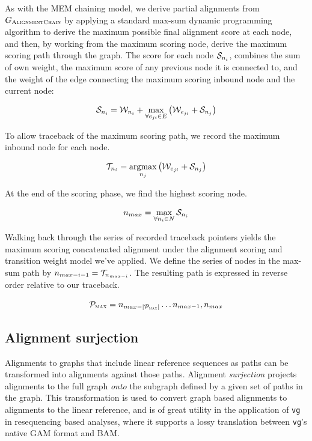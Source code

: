 As with the MEM chaining model, we derive partial alignments from $G_\textsc{AlignmentChain}$ by applying a standard max-sum dynamic programming algorithm to derive the maximum possible final alignment score at each node, and then, by working from the maximum scoring node, derive the maximum scoring path through the graph.
The score for each node ${\cal S}_{n_i}$, combines the sum of own weight, the maximum score of any previous node it is connected to, and the weight of the edge connecting the maximum scoring inbound node and the current node:

\begin{equation}
  {\cal S}_{n_i} = {\cal W}_{n_i} + \max_{\forall e_{ji} \in E} \left( {\cal W}_{e_{ji}} + {\cal S}_{n_j} \right)
\end{equation}

To allow traceback of the maximum scoring path, we record the maximum inbound node for each node.

\begin{equation}
  {\cal T}_{n_i} = \operatorname*{argmax}_{n_j} \left( {\cal W}_{e_{ji}} + {\cal S}_{n_j} \right)
\end{equation}

At the end of the scoring phase, we find the highest scoring node.

\begin{equation}
  n_{max} = \max_{\forall n_i \in N} {\cal S}_{n_i}
\end{equation}

Walking back through the series of recorded traceback pointers yields the maximum scoring concatenated alignment under the alignment scoring and transition weight model we've applied.
We define the series of nodes in the max-sum path by $n_{max-i-1} = {\cal T}_{n_{max-i}}$.
The resulting path is expressed in reverse order relative to our traceback.

\begin{equation}
  {\cal P}_\textsc{max} = n_{max-|{\cal P}_\textsc{max}|} \dots n_{max-1}, n_{max}
\end{equation}



\subsection{Alignment surjection}
\label{sec:surjection}

Alignments to graphs that include linear reference sequences as paths can be transformed into alignments against those paths.
Alignment \emph{surjection} projects alignments to the full graph \emph{onto} the subgraph defined by a given set of paths in the graph.
This transformation is used to convert graph based alignments to alignments to the linear reference, and is of great utility in the application of {\tt vg} in resequencing based analyses, where it supports a lossy translation between {\tt vg}'s native GAM format and BAM.

